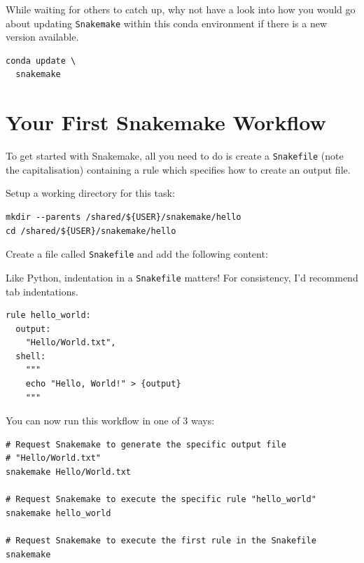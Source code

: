 \begin{bonus}

While waiting for others to catch up, why not have a look into how you would go about updating \texttt{Snakemake} within this conda environment if there is a new version available.

\begin{answer}
\begin{lstlisting}
conda update \
  snakemake
\end{lstlisting}
\end{answer}

\end{bonus}


\section{Your First Snakemake Workflow}

To get started with Snakemake, all you need to do is create a \texttt{Snakefile} (note the capitalisation) containing a rule which specifies how to create an output file.

Setup a working directory for this task:

\begin{lstlisting}
mkdir --parents /shared/${USER}/snakemake/hello
cd /shared/${USER}/snakemake/hello
\end{lstlisting}

Create a file called \texttt{Snakefile} and add the following content:

\begin{warning}

Like Python, indentation in a \texttt{Snakefile} matters! For consistency, I'd recommend tab indentations.

\end{warning}

\begin{lstlisting}
rule hello_world:
  output:
    "Hello/World.txt",
  shell:
    """
    echo "Hello, World!" > {output}
    """
\end{lstlisting}

You can now run this workflow in one of 3 ways:

\begin{lstlisting}
# Request Snakemake to generate the specific output file
# "Hello/World.txt"
snakemake Hello/World.txt

# Request Snakemake to execute the specific rule "hello_world"
snakemake hello_world

# Request Snakemake to execute the first rule in the Snakefile
snakemake
\end{lstlisting}

